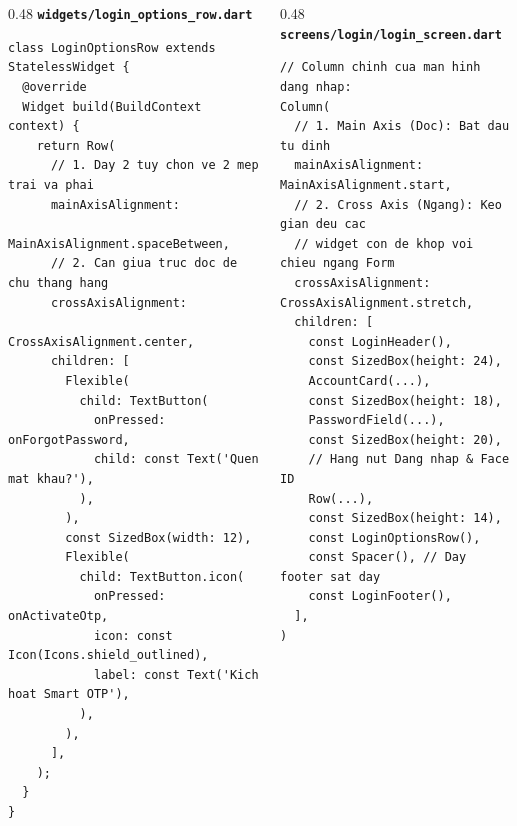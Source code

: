 \documentclass[aspectratio=169, 10pt]{beamer}
\newcommand{\SlideHeader}[2]{%
  \noindent{\textcolor{AccentOrange}{\textbf{\footnotesize #1}}}\\[0.08cm]
  \noindent{\Large \textbf{\textcolor{NavyTitle}{#2}}}\\[0.22cm]
}
\begin{document}
\begin{frame}[fragile]
  \SlideHeader{MINH HỌA MÃ NGUỒN TÁC GIẢ}{Căn Chỉnh Trục: MainAxisAlignment \& CrossAxisAlignment}

  \begin{columns}[T]
    \begin{column}{0.48\textwidth}
      \textbf{\texttt{widgets/login\_options\_row.dart}}
\begin{lstlisting}
class LoginOptionsRow extends StatelessWidget {
  @override
  Widget build(BuildContext context) {
    return Row(
      // 1. Day 2 tuy chon ve 2 mep trai va phai
      mainAxisAlignment: 
          MainAxisAlignment.spaceBetween,
      // 2. Can giua truc doc de chu thang hang
      crossAxisAlignment: 
          CrossAxisAlignment.center,
      children: [
        Flexible(
          child: TextButton(
            onPressed: onForgotPassword,
            child: const Text('Quen mat khau?'),
          ),
        ),
        const SizedBox(width: 12),
        Flexible(
          child: TextButton.icon(
            onPressed: onActivateOtp,
            icon: const Icon(Icons.shield_outlined),
            label: const Text('Kich hoat Smart OTP'),
          ),
        ),
      ],
    );
  }
}
\end{lstlisting}
    \end{column}

    \begin{column}{0.48\textwidth}
      \textbf{\texttt{screens/login/login\_screen.dart}}
\begin{lstlisting}
// Column chinh cua man hinh dang nhap:
Column(
  // 1. Main Axis (Doc): Bat dau tu dinh
  mainAxisAlignment: MainAxisAlignment.start,
  // 2. Cross Axis (Ngang): Keo gian deu cac 
  // widget con de khop voi chieu ngang Form
  crossAxisAlignment: CrossAxisAlignment.stretch,
  children: [
    const LoginHeader(),
    const SizedBox(height: 24),
    AccountCard(...),
    const SizedBox(height: 18),
    PasswordField(...),
    const SizedBox(height: 20),
    // Hang nut Dang nhap & Face ID
    Row(...),
    const SizedBox(height: 14),
    const LoginOptionsRow(),
    const Spacer(), // Day footer sat day
    const LoginFooter(),
  ],
)
\end{lstlisting}
    \end{column}
  \end{columns}
\end{frame}
\end{document}
